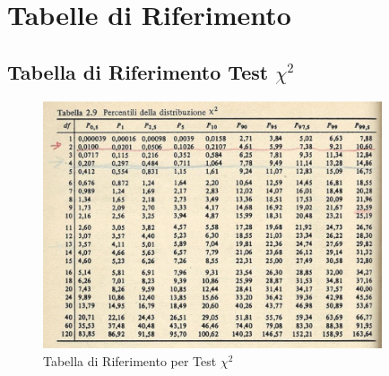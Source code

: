 \section{Tabelle di Riferimento}

\subsection{Tabella di Riferimento Test \texorpdfstring{$\chi^2$}{chi quadro}}
\begin{figure}[H]
    \centering
    \includegraphics[width=10cm, keepaspectratio]{capitoli/goodnes_of_fit/imgs/chiquadro.png}
    \caption{Tabella di Riferimento per Test $\chi^2$}
    \label{chiquadro-tabella}
\end{figure}

